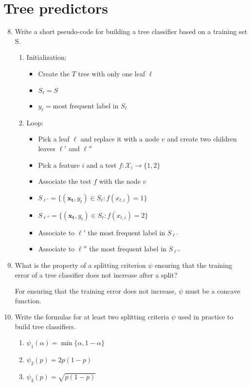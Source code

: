 \documentclass[a4paper]{article}
\newcommand{\X}{\ensuremath{\mathcal{X}}}
\begin{document}
\section{Tree predictors}
\begin{enumerate}
    \setcounter{enumi}{7}
    \item Write a short pseudo-code for building a tree classifier based on a training set S.
    
    \begin{enumerate}
        \item Initialization:
            \begin{itemize}
                \item Create the $T$ tree with only one leaf $\ell$
                \item $S_\ell = S$
                \item $y_\ell = \text{most frequent label in $S_\ell$}$
            \end{itemize}
        \item Loop:
            \begin{itemize}
                \item Pick a leaf $\ell$ and replace it with a node $v$ and create
                    two children leaves $\ell'$ and $\ell''$
                \item Pick a feature $i$ and a test $f:\X_i\to\{1,2\}$
                \item Associate the test $f$ with the node $v$
                \item $S_{\ell'}=\{(\bm{x_t},y_t)\in S_\ell:f(x_{t,i})=1\}$
                \item $S_{\ell''}=\{(\bm{x_t},y_t)\in S_\ell:f(x_{t,i})=2\}$
                \item Associate to $\ell'$ the most frequent label in $S_{\ell'}$
                \item Associate to $\ell''$ the most frequent label in $S_{\ell''}$
            \end{itemize}
    \end{enumerate}

    \item What is the property of a splitting criterion $\psi$ ensuring that the training error 
    of a tree classifier does not increase after a split?

    For ensuring that the training error does not increase, $\psi$ must be a concave function.

    \item Write the formulas for at least two splitting criteria $\psi$ used in practice to
    build tree classifiers.
    \begin{enumerate}
        \item $\psi_1(\alpha) = \min\{\alpha,1-\alpha\}$
        \item $\psi_2(p) = 2p(1-p)$
        \item $\psi_3(p) = \sqrt{p(1-p)}$
    \end{enumerate}
\end{enumerate}
\end{document}
